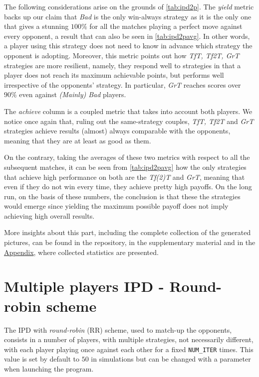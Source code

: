 \documentclass[journal,10pt,twoside]{IEEEtran}
\begin{document}
The following considerations arise on the grounds of \autoref{tab:ipd2p}.
The \textit{yield} metric backs up our claim that \textit{Bad} is the only win-always strategy as it is the only one that gives a stunning $100\%$ for all the matches playing a perfect move against every opponent, a result that can also be seen in \autoref{tab:ipd2pavg}. In other words, a player using this strategy does not need to know in advance which strategy the opponent is adopting. Moreover, this metric points out how \textit{TfT, Tf2T, GrT} strategies are more resilient, namely, they respond well to strategies in that a player does not reach its maximum achievable points, but performs well irrespective of the opponents' strategy. In particular, \textit{GrT} reaches scores over $90\%$ even against \textit{(Mainly) Bad} players.

The \textit{achieve} column is a coupled metric that takes into account both players. We notice once again that, ruling out the same-strategy couples, \textit{TfT, Tf2T} and \textit{GrT} strategies achieve results (almost) always comparable with the opponents, meaning that they are at least as good as them.

On the contrary, taking the averages of these two metrics with respect to all the subsequent matches, it can be seen from \autoref{tab:ipd2pavg} how the only strategies that achieve high performance on both are the \textit{Tf(2)T} and \textit{GrT}, meaning that even if they do not win every time, they achieve pretty high payoffs.
On the long run, on the basis of these numbers, the conclusion is that these the strategies would emerge since yielding the maximum possible payoff does not imply achieving high overall results.

More insights about this part, including the complete collection of the generated pictures, can be found in the repository, in the supplementary material and in the \hyperref[s:appendix]{Appendix}, where collected statistics are presented.

\section{Multiple players IPD - Round-robin scheme} \label{s:IPDMP}
The IPD with \textit{round-robin} (RR) scheme, used to match-up the opponents, consists in a number of players, with multiple strategies, not necessarily different, with each player playing once against each other for a fixed \texttt{NUM\_ITER} times. This value is set by default to $50$ in simulations but can be changed with a parameter when launching the program.
\end{document}
